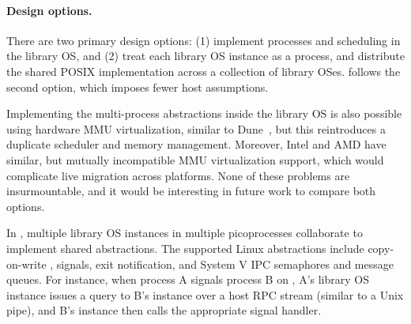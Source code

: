 \paragraph{Design options.}
There are two primary design options: (1) implement processes and scheduling in 
the library OS, and (2) treat each library OS instance as a process, and distribute the shared POSIX implementation across a collection of library OSes.
\graphene{} follows the second option, which imposes fewer host assumptions.

Implementing the multi-process abstractions
inside the library OS is also possible using 
hardware MMU virtualization, similar to Dune~\cite{belay12dune},
but this reintroduces a duplicate scheduler and memory management.
Moreover, Intel and AMD have similar, but mutually incompatible MMU virtualization support,
which would complicate live migration across platforms.
None of these problems are insurmountable, and it would be interesting in future
work to compare both options.


In \graphene{}, multiple library OS instances in multiple picoprocesses collaborate to implement shared abstractions. The supported Linux abstractions include copy-on-write , signals, exit notification, and System V IPC semaphores and message queues.
For instance, when process A signals process B on \graphene{}, A's library OS instance issues a query to B's instance over a host RPC stream (similar to a Unix pipe), and B's instance then calls the appropriate signal handler.




